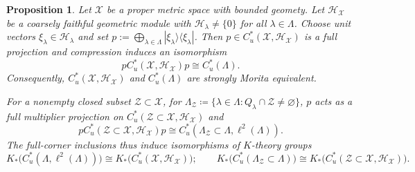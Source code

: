 \documentclass[10pt,a4paper]{amsart}
\newtheorem{proposition}{Proposition}
\newcommand{\Hh}{{\mathcal H}}
\newcommand{\Xx}{{\mathcal X}}
\newcommand{\Zz}{{\mathcal Z}}
\begin{document}
\begin{proposition}\label{prop:morita_continuous}
Let $\Xx$ be a proper metric space with bounded geomety. Let $\Hh_\Xx$ be a coarsely faithful geometric module with $\Hh_\lambda\neq \{0\}$ for all $\lambda\in \Lambda$. Choose unit vectors $\xi_\lambda\in\Hh_\lambda$ and set $p:=\bigoplus_{\lambda\in\Lambda} |\xi_\lambda\rangle\langle\xi_\lambda|$.
Then $p\in C_u^*(\Xx,\Hh_\Xx)$ is a full projection and compression induces an
isomorphism
\[ pC_u^*(\Xx,\Hh_\Xx)p\cong C_u^*(\Lambda).\]
Consequently, $C_u^*(\Xx,\Hh_\Xx)$ and $C_u^*(\Lambda)$ are strongly Morita
equivalent.

For a nonempty closed subset $\Zz \subset \Xx$, for $\Lambda_\Zz \coloneqq \{\lambda \in \Lambda: Q_{\lambda} \cap \Zz \neq \varnothing \}$, $p$ acts as a full multiplier projection on $C^*_u(\Zz \subset \Xx, \Hh_\Xx)$ and
\[pC_u^*(\Zz\subset\Xx,\Hh_\Xx)p
 \cong C_u^*(\Lambda_\Zz\subset\Lambda, \ell^2(\Lambda)).\]
The full-corner inclusions thus induce isomorphisms of $K$-theory groups
\[K_*\bigl(C_u^*(\Lambda, \ell^2(\Lambda))\bigr)
 \cong K_*\bigl(C_u^*(\Xx,\Hh_\Xx)\bigr); \qquad  K_*\bigl(C_u^*(\Lambda_\Zz\subset\Lambda)\bigr)
 \cong K_*\bigl(C_u^*(\Zz\subset\Xx,\Hh_\Xx)\bigr).\]
\end{proposition}
\end{document}
